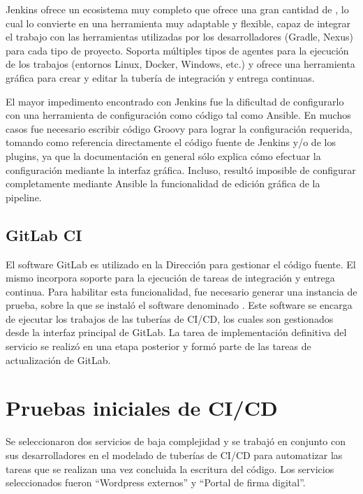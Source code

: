 Jenkins ofrece un ecosistema muy completo que ofrece una gran cantidad
de , lo cual lo convierte en una herramienta muy
adaptable y flexible, capaz de integrar el trabajo con las
herramientas utilizadas por los desarrolladores (Gradle, Nexus) para
cada tipo de proyecto. Soporta múltiples tipos de agentes para la
ejecución de los trabajos (entornos Linux, Docker, Windows, etc.) y
ofrece una herramienta gráfica para crear y editar la tubería de
integración y entrega continuas.

El mayor impedimento encontrado con Jenkins fue la dificultad de
configurarlo con una herramienta de configuración como código tal como
Ansible. En muchos casos fue necesario escribir código Groovy para
lograr la configuración requerida, tomando como referencia
directamente el código fuente de Jenkins y/o de los plugins, ya que la
documentación en general sólo explica cómo efectuar la configuración
mediante la interfaz gráfica. Incluso, resultó imposible de configurar
completamente mediante Ansible la funcionalidad de edición gráfica de
la pipeline.

\subsection{GitLab CI}

El software GitLab es utilizado en la Dirección para gestionar el
código fuente. El mismo incorpora soporte para la ejecución de tareas
de integración y entrega continua. Para habilitar esta funcionalidad,
fue necesario generar una instancia de prueba, sobre la que se instaló
el software denominado . Este software se
encarga de ejecutar los trabajos de las tuberías de CI/CD, los cuales
son gestionados desde la interfaz principal de GitLab. La tarea de
implementación definitiva del servicio  se
realizó en una etapa posterior y formó parte de las tareas de
actualización de GitLab.

\section{Pruebas iniciales de CI/CD}

Se seleccionaron dos servicios de baja complejidad y se trabajó en
conjunto con sus desarrolladores en el modelado de tuberías de CI/CD
para automatizar las tareas que se realizan una vez concluida la
escritura del código. Los servicios seleccionados fueron ``Wordpress
externos'' y ``Portal de firma digital''.

